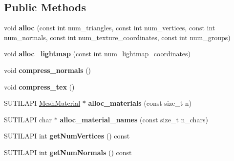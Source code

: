 \subsection*{Public Methods}
\begin{DoxyCompactItemize}
\item 
\mbox{\label{class_mesh_storage_a2a26bf8ce12c14b3a3c638d01b5db0ba}} 
void {\bfseries alloc} (const int num\+\_\+triangles, const int num\+\_\+vertices, const int num\+\_\+normals, const int num\+\_\+texture\+\_\+coordinates, const int num\+\_\+groups)
\item 
\mbox{\label{class_mesh_storage_a81ebc7a6397f8e83d10e7242b5ab7a30}} 
void {\bfseries alloc\+\_\+lightmap} (const int num\+\_\+lightmap\+\_\+coordinates)
\item 
\mbox{\label{class_mesh_storage_aacf7203fecfad1d3d15959bc053628dd}} 
void {\bfseries compress\+\_\+normals} ()
\item 
\mbox{\label{class_mesh_storage_a85773c6742a20d10d7291d7c3f571b37}} 
void {\bfseries compress\+\_\+tex} ()
\item 
\mbox{\label{class_mesh_storage_a289b45038006451780fdb87d72782745}} 
S\+U\+T\+I\+L\+A\+PI \hyperlink{struct_mesh_material}{Mesh\+Material} $\ast$ {\bfseries alloc\+\_\+materials} (const size\+\_\+t n)
\item 
\mbox{\label{class_mesh_storage_abd714f1144efe9069e352dc07cb85a89}} 
S\+U\+T\+I\+L\+A\+PI char $\ast$ {\bfseries alloc\+\_\+material\+\_\+names} (const size\+\_\+t n\+\_\+chars)
\item 
\mbox{\label{class_mesh_storage_a2ffe68e15e5634c64e884996b9d09220}} 
S\+U\+T\+I\+L\+A\+PI int {\bfseries get\+Num\+Vertices} () const
\item 
\mbox{\label{class_mesh_storage_a68ec29f17951ca0f3bbedc47e2ecc6ae}} 
S\+U\+T\+I\+L\+A\+PI int {\bfseries get\+Num\+Normals} () const
\item 
\mbox{\label{class_mesh_storage_a0f3825d3e327565f1f48b81bcb947d02}} 

\end{DoxyCompactItemize}
